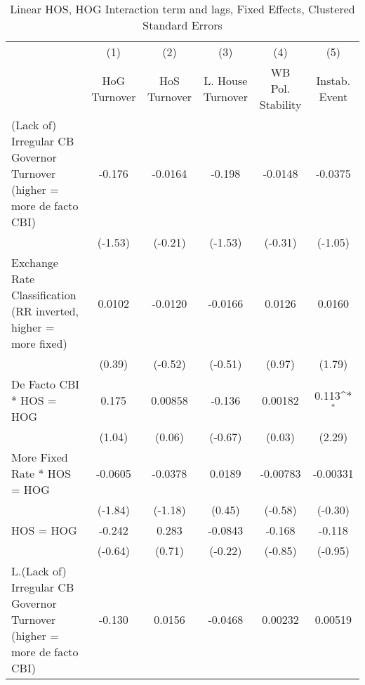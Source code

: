 {
\def\sym#1{\ifmmode^{#1}\else\(^{#1}\)\fi}
\begin{longtable}{l*{5}{c}}
\caption{Linear HOS, HOG Interaction term and lags, Fixed Effects, Clustered Standard Errors \label{hoshogintlagsDF}}\\
\hline\hline\endfirsthead\hline\endhead\hline\endfoot\endlastfoot
                &\multicolumn{1}{c}{(1)}&\multicolumn{1}{c}{(2)}&\multicolumn{1}{c}{(3)}&\multicolumn{1}{c}{(4)}&\multicolumn{1}{c}{(5)}\\
                &\multicolumn{1}{c}{HoG Turnover}&\multicolumn{1}{c}{HoS Turnover}&\multicolumn{1}{c}{L. House Turnover}&\multicolumn{1}{c}{WB Pol. Stability}&\multicolumn{1}{c}{Instab. Event}\\
\hline
(Lack of) Irregular CB Governor Turnover (higher = more de facto CBI)&   -0.176         &  -0.0164         &   -0.198         &  -0.0148         &  -0.0375         \\
                &  (-1.53)         &  (-0.21)         &  (-1.53)         &  (-0.31)         &  (-1.05)         \\
[1em]
Exchange Rate Classification (RR inverted, higher = more fixed)&   0.0102         &  -0.0120         &  -0.0166         &   0.0126         &   0.0160         \\
                &   (0.39)         &  (-0.52)         &  (-0.51)         &   (0.97)         &   (1.79)         \\
[1em]
De Facto CBI * HOS = HOG&    0.175         &  0.00858         &   -0.136         &  0.00182         &    0.113\sym{*}  \\
                &   (1.04)         &   (0.06)         &  (-0.67)         &   (0.03)         &   (2.29)         \\
[1em]
More Fixed Rate * HOS = HOG&  -0.0605         &  -0.0378         &   0.0189         & -0.00783         & -0.00331         \\
                &  (-1.84)         &  (-1.18)         &   (0.45)         &  (-0.58)         &  (-0.30)         \\
[1em]
HOS = HOG       &   -0.242         &    0.283         &  -0.0843         &   -0.168         &   -0.118         \\
                &  (-0.64)         &   (0.71)         &  (-0.22)         &  (-0.85)         &  (-0.95)         \\
[1em]
L.(Lack of) Irregular CB Governor Turnover (higher = more de facto CBI)&   -0.130         &   0.0156         &  -0.0468         &  0.00232         &  0.00519         \\

\end{longtable}}
